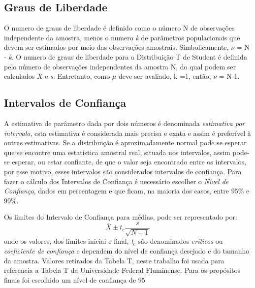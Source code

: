 \subsection{Graus de Liberdade}
O numero de graus de liberdade é definido como o número N de observações independente da amostra, menos o numero \textit{k} de parâmetros populacionais que devem ser estimados por meio das observações amostrais. Simbolicamente, $\nu$ = N - \textit{k}.
O numero de graus de liberdade para a Distribuição T de Student é definida pelo número de observações independentes da amostra N, do qual podem ser calculados $\bar{X}$ e \textit{s}. Entretanto, como $\mu$  deve ser avaliado, k =1, então, $\nu$ = N-1.


\subsection{Intervalos de Confiança}

A estimativa de parâmetro dada por dois números é denominada \textit{estimativa por intervalo}, esta estimativa é considerada mais precisa e exata e assim é preferível à outras estimativas. Se a distribuição é aproximadamente normal pode se esperar que se encontre uma estatística amostral real, situada nos intervalos, assim pode-se esperar, ou estar confiante, de que o valor seja encontrado entre os intervalos, por esse motivo, esses intervalos são considerados intervalos de confiança. Para fazer o cálculo dos Intervalos de Confiança é necessário escolher o \textit{Nível de Confiança}, dados em percentagem e que ficam, na maioria dos casos, entre 95\% e 99\%.

Os limites do Intervalo de Confiança para médias, pode ser representado por:
\begin{displaymath}
\bar{X}  \pm \mathit{t}_{\mathit{c}}\frac{\mathit{s}}{{\sqrt{N-1}}}
\end{displaymath}
onde os valores, dos limites iniciai e final, \textit{t$_c$} são denominados \textit{críticos} ou \textit{coeficiente de confiança} e dependem do nível de confiança desejado e do tamanho da amostra. Valores retirados da Tabela T, neste trabalho foi usada para referencia a Tabela T da Universidade Federal Fluminense\cite{TabelaUFF}. Para os propósitos finais foi escolhido um nível de confiança de 95%
